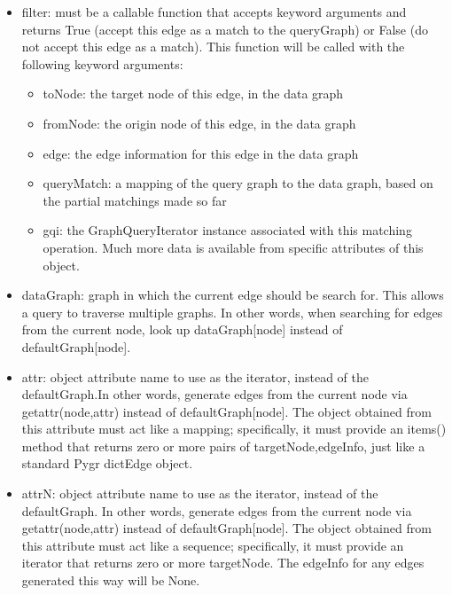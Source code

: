 \documentclass{howto}
\begin{document}
\begin{itemize}

\item
filter: must be a callable function that accepts keyword arguments and returns True (accept this edge as a match to the queryGraph) or False (do not accept this edge as a match).  This function will be called with the following keyword arguments:
       \begin{itemize}
          \item
          toNode: the target node of this edge, in the data graph
          \item
          fromNode: the origin node of this edge, in the data graph
          \item
           edge: the edge information for this edge in the data graph
          \item 
           queryMatch: a mapping of the query graph to the data graph, based on the partial matchings made so far
           \item
           gqi: the GraphQueryIterator instance associated with this matching operation.  Much more data is available from specific attributes of this object.
	\end{itemize}

\item 
dataGraph: graph in which the current edge should be search for.  This allows a query to traverse multiple graphs.  In other words, when searching for edges from the current node, look up dataGraph[node] instead of defaultGraph[node].

\item
attr: object attribute name to use as the iterator, instead of the defaultGraph.In other words, generate edges from the current node via getattr(node,attr) instead of defaultGraph[node].  The object obtained from this attribute must act like a mapping; specifically, it must provide an items() method that returns zero or more pairs of targetNode,edgeInfo, just like a standard Pygr dictEdge object. 

\item
attrN: object attribute name to use as the iterator, instead of the defaultGraph. In other words, generate edges from the current node via getattr(node,attr) instead of defaultGraph[node].  The object obtained from this attribute must act like a sequence; specifically, it must provide an iterator that returns zero or more targetNode.  The edgeInfo for any edges generated this way will be None.


\end{itemize}
\end{document}
